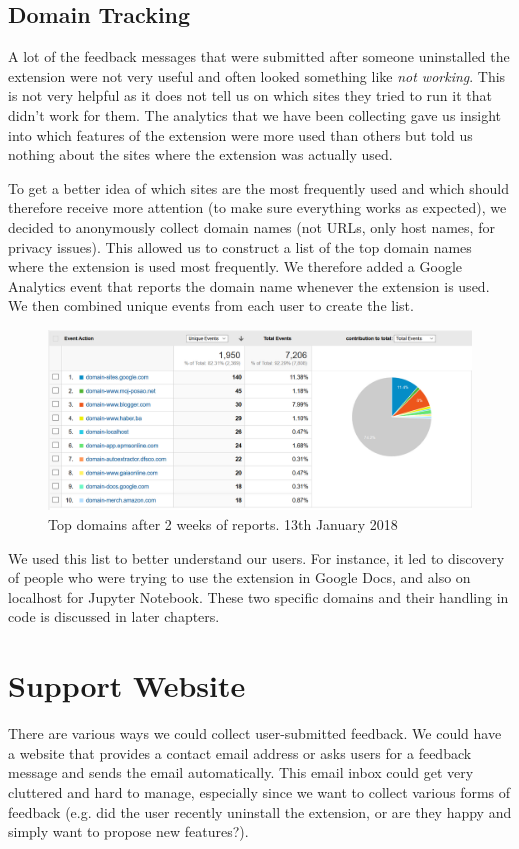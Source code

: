 \documentclass[bsc,frontabs,twoside,singlespacing,parskip,deptreport]{infthesis}
\begin{document}
\subsection{Domain Tracking}
A lot of the feedback messages that were submitted after someone uninstalled the extension were not very useful and often looked something like \textit{not working}. This is not very helpful as it does not tell us on which sites they tried to run it that didn't work for them. The analytics that we have been collecting gave us insight into which features of the extension were more used than others but told us nothing about the sites where the extension was actually used.

To get a better idea of which sites are the most frequently used and which should therefore receive more attention (to make sure everything works as expected), we decided to anonymously collect domain names (not URLs, only host names, for privacy issues). This allowed us to construct a list of the top domain names where the extension is used most frequently. We therefore added a Google Analytics event that reports the domain name whenever the extension is used. We then combined unique events from each user to create the list.

\begin{figure}[h]
\centering
\includegraphics[width=1\textwidth]{../docs/top-domains.png}
\caption{Top domains after 2 weeks of reports. 13th January 2018}
\end{figure}

We used this list to better understand our users. For instance, it led to discovery of people who were trying to use the extension in Google Docs, and also on localhost for Jupyter Notebook. These two specific domains and their handling in code is discussed in later chapters.

\section{Support Website}
There are various ways we could collect user-submitted feedback. We could have a website that provides a contact email address or asks users for a feedback message and sends the email automatically. This email inbox could get very cluttered and hard to manage, especially since we want to collect various forms of feedback (e.g. did the user recently uninstall the extension, or are they happy and simply want to propose new features?). 
\end{document}
